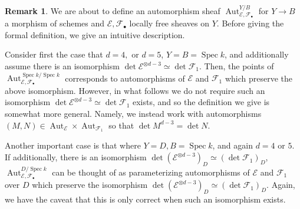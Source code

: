 \documentclass[12 pt]{amsart}
\theoremstyle{plain}
\theoremstyle{definition}
\newtheorem{remark}[theorem]{Remark}
\theoremstyle{remark}
\numberwithin{equation}{section}
\newcommand\sce{\mathscr E}
\newcommand\scf{\mathscr F}
\DeclareMathOperator\spec{\operatorname{Spec}}
\DeclareMathOperator\aut{Aut}
\begin{document}
\begin{remark}
	\label{remark:intuitive-aut}
	We are about to define an automorphism sheaf $\aut_{\sce,
\scf_\bullet}^{Y/B}$ for $Y \to B$ a morphism of schemes and $\sce, \mathscr
F_\bullet$ locally free sheaves on $Y$.
Before giving the formal definition, we give an intuitive description.

Consider first the case that $d = 4,$ or $d = 5$, $Y = B = \spec k$,
and additionally assume there is an isomorphism 
$\det \sce^{\otimes d-3} \simeq \det \scf_1$.
Then, the points of 
$\aut_{\sce,\scf_\bullet}^{\spec k/\spec k}$
corresponds to automorphisms of $\sce$ and $\scf_1$ which
preserve the above isomorphism.
However, in what follows we do not require such an isomorphism 
$\det \sce^{\otimes d-3} \simeq \det \scf_1$
exists, and so the definition we give is
somewhat more general.
Namely, we instead work with automorphisms $(M, N) \in \aut_\sce \times
\aut_{\scf_1}$ so that $\det M^{d-3} = \det N$.

Another important case is that where $Y = D, B = \spec k$, and again $d= 4$ or
$5$. 
If additionally, there is an isomorphism
$\det (\sce^{\otimes d-3})_D \simeq (\det \scf_1)_D$,
$\aut_{\sce,\scf_\bullet}^{D/\spec k}$ can be thought of as parameterizing automorphisms
of $\sce$ and $\scf_1$ over $D$ which preserve the isomorphism
$\det (\sce^{\otimes d-3})_D \simeq (\det \scf_1)_D$.
Again, we have the caveat that this is only correct when such an isomorphism exists.
\end{remark}
\end{document}
